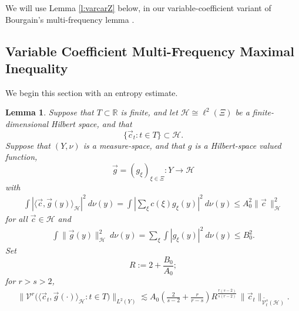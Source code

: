 \documentclass[12pt]{amsart}
\numberwithin{equation}{section}
\newtheorem{lemma}[theorem]{Lemma}
\theoremstyle{definition}
\begin{document}
We will use Lemma \ref{l:varcarZ} below, in our variable-coefficient variant of Bourgain's multi-frequency lemma \cite{B2}.

\subsection{Variable Coefficient Multi-Frequency Maximal Inequality}
We begin this section with an entropy estimate.

\begin{lemma}\label{l:entest}
    Suppose that $T \subset \mathbb{R}$ is finite, and let $\mathcal{H} \cong \ell^2(\Xi)$ be a finite-dimensional Hilbert space, and that 
    \[ \{ \vec{c}_t : t \in T \} \subset \mathcal{H}.\]
Suppose that $(Y,\nu)$ is a measure-space, and that $g$ is a Hilbert-space valued function,
\[ \vec{g} = (g_\xi)_{\xi \in \Xi}: Y \to \mathcal{H}\]
with
\begin{align}
    \int |\langle \vec{c},\vec{g}(y) \rangle_{\mathcal{H}}|^2 \ d\nu(y) = \int |\sum_{\xi} c(\xi) g_\xi(y)|^2 \ d\nu(y) \leq A_0^2 \| \vec{c} \, \|_{\mathcal{H}}^2
\end{align}
for all $\vec{c} \in \mathcal{H}$
and
\begin{align}
    \int \| \vec{g}(y) \|_{\mathcal{H}}^2 \ d\nu(y) = \sum_\xi \int |g_\xi(y)|^2 \ d\nu(y) \leq B_0^2.
\end{align}
Set
\[ R := 2 + \frac{B_0}{A_0};\]
for $r>s > 2$,
\begin{align}\label{e:var-entropy-conclusion}
    \Big\|
    \mathcal{V}^r\big(\langle \vec c_t,\vec g(\cdot)\rangle_{\mathcal H}:t\in T\big)
    \Big\|_{L^2(Y)}
    \lesssim
    A_0 \left( \frac{2}{s-2}+\frac{r}{r-s} \right) R^{\frac{r(s-2)}{s(r-2)}} \,
    \| \vec{c}_t \|_{\widetilde{\mathcal{V}_t^s}(\mathcal{H})}.
\end{align}
\end{lemma}
\end{document}
